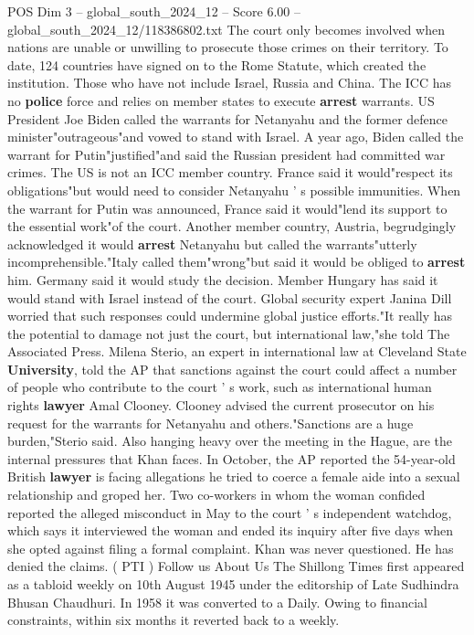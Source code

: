 \begin{textsample}{POS Dim 3 – global\_south\_2024\_12 – Score 6.00 – global\_south\_2024\_12/118386802.txt}
The court only becomes involved when nations are unable or unwilling to prosecute those crimes on their territory.
To date, 124 countries have signed on to the Rome Statute, which created the institution.
Those who have not include Israel, Russia and China.
The ICC has no \textbf{police} force and relies on member states to execute \textbf{arrest} warrants.
US President Joe Biden called the warrants for Netanyahu and the former defence minister"outrageous"and vowed to stand with Israel.
A year ago, Biden called the warrant for Putin"justified"and said the Russian president had committed war crimes.
The US is not an ICC member country.
France said it would"respect its obligations"but would need to consider Netanyahu ' s possible immunities.
When the warrant for Putin was announced, France said it would"lend its support to the essential work"of the court.
Another member country, Austria, begrudgingly acknowledged it would \textbf{arrest} Netanyahu but called the warrants"utterly incomprehensible."Italy called them"wrong"but said it would be obliged to \textbf{arrest} him.
Germany said it would study the decision.
Member Hungary has said it would stand with Israel instead of the court.
Global security expert Janina Dill worried that such responses could undermine global justice efforts."It really has the potential to damage not just the court, but international law,"she told The Associated Press.
Milena Sterio, an expert in international law at Cleveland State \textbf{University}, told the AP that sanctions against the court could affect a number of people who contribute to the court ' s work, such as international human rights \textbf{lawyer} Amal Clooney.
Clooney advised the current prosecutor on his request for the warrants for Netanyahu and others."Sanctions are a huge burden,"Sterio said.
Also hanging heavy over the meeting in the Hague, are the internal pressures that Khan faces.
In October, the AP reported the 54-year-old British \textbf{lawyer} is facing allegations he tried to coerce a female aide into a sexual relationship and groped her.
Two co-workers in whom the woman confided reported the alleged misconduct in May to the court ' s independent watchdog, which says it interviewed the woman and ended its inquiry after five days when she opted against filing a formal complaint.
Khan was never questioned.
He has denied the claims. ( PTI ) Follow us About Us The Shillong Times first appeared as a tabloid weekly on 10th August 1945 under the editorship of Late Sudhindra Bhusan Chaudhuri.
In 1958 it was converted to a Daily.
Owing to financial constraints, within six months it reverted back to a weekly.

\end{textsample}
